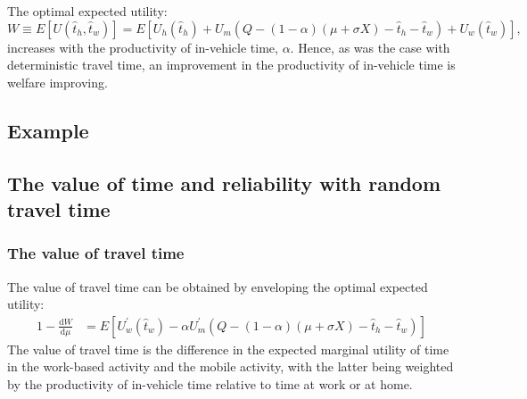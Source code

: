 \documentclass[12pt,a4paper,british]{article}
\theoremstyle{definition}
\theoremstyle{plain}
\theoremstyle{plain}
\begin{document}
The optimal expected utility: 
\begin{equation*}
W\equiv E\left[U\left(\hat{t}_{h},\hat{t}_{w}\right)\right]=E\left[U_{h}\left(\hat{t}_{h}\right)+U_{m}\left(Q-\left(1-\alpha\right)\left(\mu+\sigma X\right)-\hat{t}_{h}-\hat{t}_{w}\right)+U_{w}\left(\hat{t}_{w}\right)\right],
\end{equation*}
increases with the productivity of in-vehicle time, $\alpha$. Hence, as was the case with deterministic travel time, an improvement in
the productivity of in-vehicle time is welfare improving.

\subsection{Example}

\subsection{The value of time and reliability with random travel time}

\subsubsection*{The value of travel time}

The value of travel time can be obtained by enveloping the optimal expected utility:
\begin{alignat*}{1}
-\frac{\mathrm{d}W}{\mathrm{d}\mu} & =E\left[U_{w}^{\prime}\left(\hat{t}_{w}\right)-\alpha U_{m}^{\prime}\left(Q-\left(1-\alpha\right)\left(\mu+\sigma X\right)-\hat{t}_{h}-\hat{t}_{w}\right)\right]
\end{alignat*}
The value of travel time is the difference in the expected marginal utility of time in the work-based activity and the mobile activity,
with the latter being weighted by the productivity of in-vehicle time relative to time at work or at home. 
\end{document}
